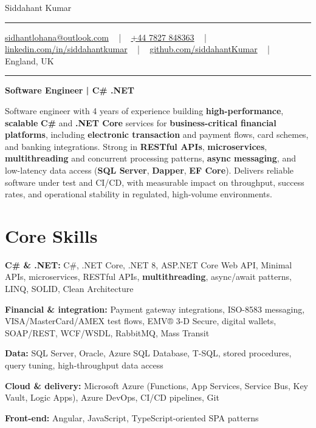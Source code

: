 \documentclass[letterpaper,10pt]{article}
\newcommand{\documentTitle}[2]{
  \begin{center}
    \vspace*{-0.3in}
    {\Huge\color{accentTitle} #1}
    \vspace{8pt}
    {\color{accentLine} \hrule}
    \vspace{2pt}
    \footnotesize{#2}
    \vspace{2pt}
    {\color{accentLine} \hrule}
  \end{center}
}
\newenvironment{resume_list}{
  \vspace{-7pt}
  \begin{itemize}[itemsep=-2px, parsep=1pt, leftmargin=30pt]
}{
  \end{itemize}
}
\begin{document}
\documentTitle{Siddahant Kumar}{
\vspace{0.1cm}
\href{mailto:sidhantlohana@outlook.com}{sidhantlohana@outlook.com} ~ | ~
\href{tel:+447827848363}{+44 7827 848363} ~ | ~
\href{https://www.linkedin.com/in/siddahantkumar/}{linkedin.com/in/siddahantkumar} ~ | ~
\href{https://github.com/siddahantKumar}{github.com/siddahantKumar} ~ | ~
England, UK
}

\begin{center}
\textbf{Software Engineer | C\# .NET}
\end{center}

Software engineer with 4 years of experience building \textbf{high-performance}, \textbf{scalable} \textbf{C\#} and \textbf{.NET Core} services for \textbf{business-critical financial platforms}, including \textbf{electronic transaction} and payment flows, card schemes, and banking integrations. Strong in \textbf{RESTful APIs}, \textbf{microservices}, \textbf{multithreading} and concurrent processing patterns, \textbf{async messaging}, and low-latency data access (\textbf{SQL Server}, \textbf{Dapper}, \textbf{EF Core}). Delivers reliable software under test and CI/CD, with measurable impact on throughput, success rates, and operational stability in regulated, high-volume environments.


\section{Core Skills}

\begin{resume_list}
    \item \textbf{C\# \& .NET:} C\#, .NET Core, .NET 8, ASP.NET Core Web API, Minimal APIs, microservices, RESTful APIs, \textbf{multithreading}, async/await patterns, LINQ, SOLID, Clean Architecture
    \item \textbf{Financial \& integration:} Payment gateway integrations, ISO-8583 messaging, VISA/MasterCard/AMEX test flows, EMV® 3-D Secure, digital wallets, SOAP/REST, WCF/WSDL, RabbitMQ, Mass Transit
    \item \textbf{Data:} SQL Server, Oracle, Azure SQL Database, T-SQL, stored procedures, query tuning, high-throughput data access
    \item \textbf{Cloud \& delivery:} Microsoft Azure (Functions, App Services, Service Bus, Key Vault, Logic Apps), Azure DevOps, CI/CD pipelines, Git
    \item \textbf{Front-end:} Angular, JavaScript, TypeScript-oriented SPA patterns
\end{resume_list}
\end{document}
